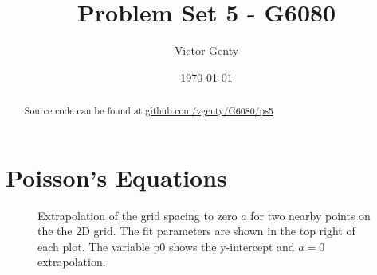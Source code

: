 \documentclass[singlepage,notitlepage,nofootinbib,11pt]{revtex4-1}
\begin{document}
\title{Problem Set 5 - G6080}
\author{Victor Genty}
\date{\today}
\begin{abstract}
\centering
Source code can be found at \href{https://github.com/vgenty/G6080/tree/master/ps5}{github.com/vgenty/G6080/ps5}
\end{abstract}
\maketitle
\section{Poisson's Equations}


\begin{figure}[h]
  \centering
  \captionsetup[subfigure]{labelformat=empty}
  \caption{\label{extrapolation} Extrapolation of the grid spacing to zero $a$ for two nearby points on the the 2D grid. The fit parameters are shown in the top right of each plot. The variable p0 shows the y-intercept and $a=0$ extrapolation.}
\end{figure}
\end{document}
